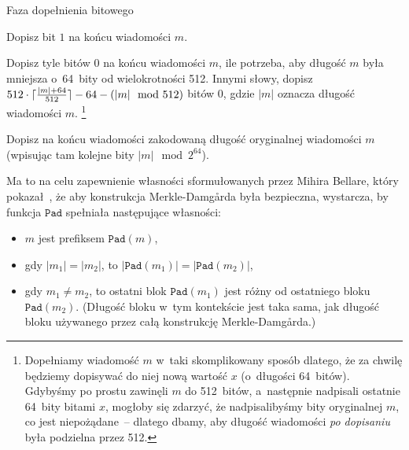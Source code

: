 \begin{myenumerate}

    \item Faza dopełnienia bitowego

    \begin{myenumerate}

        \item Dopisz bit $1$ na końcu wiadomości $m$.

        \item Dopisz tyle bitów $0$ na końcu wiadomości $m$, ile potrzeba, aby
        długość $m$ była mniejsza o~64~bity od wielokrotności 512. Innymi
        słowy, dopisz $512 \cdot \lceil\frac{|m|+64}{512}\rceil-64-(|m| \mod{512})$
        bitów $0$, gdzie $|m|$ oznacza długość wiadomości $m$.
        \footnote{Dopełniamy wiadomość $m$ w~taki skomplikowany sposób dlatego,
        że za chwilę będziemy dopisywać do niej nową wartość $x$ (o~długości
        64~bitów). Gdybyśmy po prostu zawinęli $m$ do 512~bitów, a~następnie
        nadpisali ostatnie 64~bity bitami $x$, mogłoby się zdarzyć, że
        nadpisalibyśmy bity oryginalnej $m$, co jest niepożądane~-- dlatego
        dbamy, aby długość wiadomości \emph{po dopisaniu} była podzielna przez
        512.}

        \item Dopisz na końcu wiadomości zakodowaną długość oryginalnej
        wiadomości $m$ (wpisując tam kolejne bity $|m| \mod{2^{64}}$).

        Ma to na celu zapewnienie własności sformułowanych przez Mihira
        Bellare, który pokazał~\cite{merkle_damgard_strengthening}, że aby
        konstrukcja Merkle-Damg\r{a}rda była bezpieczna, wystarcza, by funkcja
        $\mathtt{Pad}$ spełniała następujące własności:

        \begin{itemize}

            \item $m$ jest prefiksem $\mathtt{Pad}(m)$,

            \item gdy $|m_1| = |m_2|$, to $|\mathtt{Pad}(m_1)| =
            |\mathtt{Pad}(m_2)|$,

            \item gdy $m_1 \neq m_2$, to ostatni blok $\mathtt{Pad}(m_1)$ jest
            różny od ostatniego bloku $\mathtt{Pad}(m_2)$. (Długość bloku w~tym
            kontekście jest taka sama, jak długość bloku używanego przez całą
            konstrukcję Merkle-Damg\r{a}rda.)


\end{itemize}
\end{myenumerate}
\end{myenumerate}
